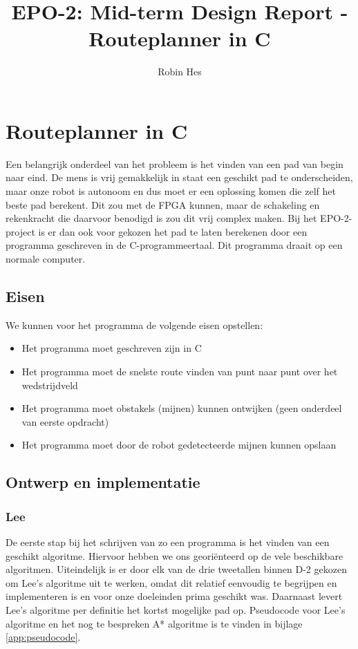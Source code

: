\documentclass{report}
\title{EPO-2: Mid-term Design Report - Routeplanner in C}
\author{Robin Hes}
\begin{document}
\chapter{Routeplanner in C}
\label{ch:route}

Een belangrijk onderdeel van het probleem is het vinden van een pad van begin naar eind.
De mens is vrij gemakkelijk in staat een geschikt pad te onderscheiden, maar onze robot is autonoom en dus moet er een oplossing komen die zelf het beste pad berekent.
Dit zou met de FPGA kunnen, maar de schakeling en rekenkracht die daarvoor benodigd is zou dit vrij complex maken.
Bij het EPO-2-project is er dan ook voor gekozen het pad te laten berekenen door een programma geschreven in de C-programmeertaal.
Dit programma draait op een normale computer.

\section{Eisen}
\label{route-eisen}

We kunnen voor het programma de volgende eisen opstellen:

\begin{itemize}
	\item Het programma moet geschreven zijn in C
	\item Het programma moet de snelste route vinden van punt naar punt over het wedstrijdveld
	\item Het programma moet obstakels (mijnen) kunnen ontwijken (geen onderdeel van eerste opdracht)
	\item Het programma moet door de robot gedetecteerde mijnen kunnen opslaan
\end{itemize}

\section{Ontwerp en implementatie}
\label{sec:ontwerp-impl}

\subsection{Lee}
\label{ssec:lee}

De eerste stap bij het schrijven van zo een programma is het vinden van een geschikt algoritme.
Hiervoor hebben we ons georiënteerd op de vele beschikbare algoritmen.
Uiteindelijk is er door elk van de drie tweetallen binnen D-2 gekozen om Lee's algoritme uit te werken, omdat dit relatief eenvoudig te begrijpen en implementeren is en voor onze doeleinden prima geschikt was.
Daarnaast levert Lee's algoritme per definitie het kortst mogelijke pad op.
Pseudocode voor Lee's algoritme en het nog te bespreken A* algoritme is te vinden in bijlage \ref{app:pseudocode}.
\end{document}
